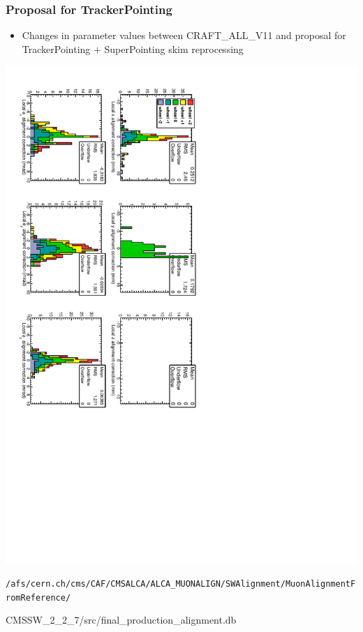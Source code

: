 \documentclass[compress]{beamer}
\begin{document}
\begin{frame}
\frametitle{Proposal for TrackerPointing}

\begin{itemize}
\item Changes in parameter values between CRAFT\_ALL\_V11 and proposal for TrackerPointing $+$ SuperPointing skim reprocessing
\end{itemize}

\vfill
\includegraphics[height=\linewidth, angle=90]{data_final_corrections.pdf}

\vfill
{\tiny \tt /afs/cern.ch/cms/CAF/CMSALCA/ALCA\_MUONALIGN/SWAlignment/MuonAlignmentFromReference/

\hfill CMSSW\_2\_2\_7/src/final\_production\_alignment.db}
\end{frame}
\end{document}

